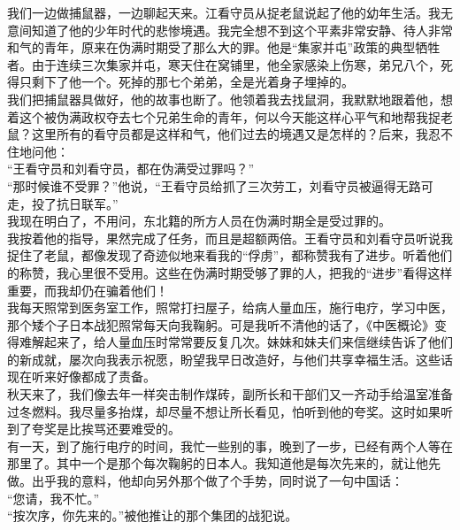 我们一边做捕鼠器，一边聊起天来。江看守员从捉老鼠说起了他的幼年生活。我无意间知道了他的少年时代的悲惨境遇。我完全想不到这个平素非常安静、待人非常和气的青年，原来在伪满时期受了那么大的罪。他是“集家并屯”政策的典型牺牲者。由于连续三次集家并屯，寒天住在窝铺里，他全家感染上伤寒，弟兄八个，死得只剩下了他一个。死掉的那七个弟弟，全是光着身子埋掉的。\\

我们把捕鼠器具做好，他的故事也断了。他领着我去找鼠洞，我默默地跟着他，想着这个被伪满政权夺去七个兄弟生命的青年，何以今天能这样心平气和地帮我捉老鼠？这里所有的看守员都是这样和气，他们过去的境遇又是怎样的？后来，我忍不住地问他：\\

“王看守员和刘看守员，都在伪满受过罪吗？”\\

“那时候谁不受罪？”他说，“王看守员给抓了三次劳工，刘看守员被逼得无路可走，投了抗日联军。”\\

我现在明白了，不用问，东北籍的所方人员在伪满时期全是受过罪的。\\

我按着他的指导，果然完成了任务，而且是超额两倍。王看守员和刘看守员听说我捉住了老鼠，都像发现了奇迹似地来看我的“俘虏”，都称赞我有了进步。听着他们的称赞，我心里很不受用。这些在伪满时期受够了罪的人，把我的“进步”看得这样重要，而我却仍在骗着他们！\\

我每天照常到医务室工作，照常打扫屋子，给病人量血压，施行电疗，学习中医，那个矮个子日本战犯照常每天向我鞠躬。可是我听不清他的话了，《中医概论》变得难解起来了，给人量血压时常常要反复几次。妹妹和妹夫们来信继续告诉了他们的新成就，屡次向我表示祝愿，盼望我早日改造好，与他们共享幸福生活。这些话现在听来好像都成了责备。\\

秋天来了，我们像去年一样突击制作煤砖，副所长和干部们又一齐动手给温室准备过冬燃料。我尽量多抬煤，却尽量不想让所长看见，怕听到他的夸奖。这时如果听到了夸奖是比挨骂还要难受的。\\

有一天，到了施行电疗的时间，我忙一些别的事，晚到了一步，已经有两个人等在那里了。其中一个是那个每次鞠躬的日本人。我知道他是每次先来的，就让他先做。出乎我的意料，他却向另外那个做了个手势，同时说了一句中国话：\\

“您请，我不忙。”\\

“按次序，你先来的。”被他推让的那个集团的战犯说。\\

